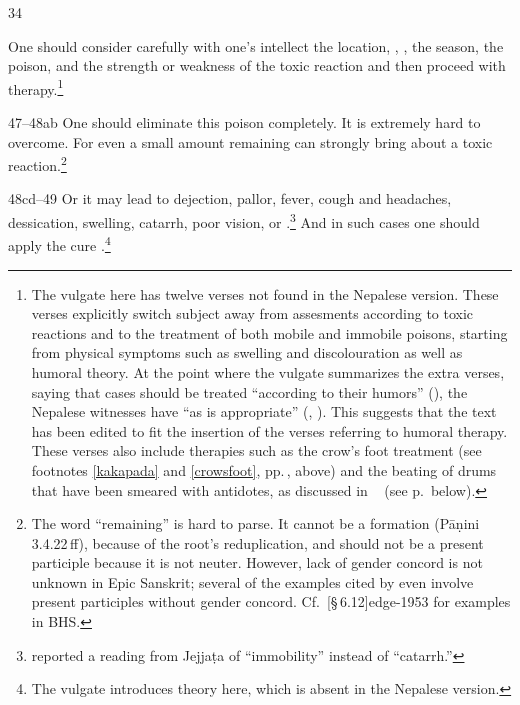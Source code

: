 \begin{translation}
\item[34]

One should consider carefully with one's intellect the location,
, , the season, the
poison, and the strength or weakness of the toxic reaction and then
proceed with therapy.\footnote{The vulgate here has twelve verses not
    found in the Nepalese version.  These verses explicitly switch subject
    away from assesments according to toxic reactions and to the treatment of
    both mobile and immobile poisons, starting from physical symptoms such as
    swelling and discolouration as well as humoral theory. At the point where
    the vulgate summarizes the extra verses, saying that cases should be
    treated “according to their humors” (), the Nepalese
    witnesses have “as is appropriate” (,
    ).  This suggests that the text has been edited to fit
    the insertion of the verses referring to humoral therapy.  These verses also 
    include therapies such as the crow's foot treatment (see footnotes
    \ref{kakapada} and \ref{crowsfoot}, pp.\,\pageref{kakapada}, 
    \pageref{crowsfoot} above) and the beating of drums 
    that have been smeared with antidotes, as discussed in \SS\ 
     (see p.\,\pageref{dundubhi} below).}

\item [47--48ab] One should eliminate this poison completely.  It is
extremely hard to overcome. For even a small amount remaining can
strongly bring about a toxic reaction.\footnote{The word
     “remaining” is hard to parse.  It cannot be a
    \dev{ṇamul} formation (Pāṇini 3.4.22\,ff), because of the root's
    reduplication, and should not be a present participle because it is
    not neuter.  However, lack of gender concord is not unknown in Epic
    Sanskrit; several of the examples cited by
    \citet[\S\,10.2.1]{ober-2003} even involve present participles without
    gender concord. Cf.\ \volcite{1}[\S\,6.12]{edge-1953} for examples in
    BHS.}

\item[48cd--49] Or it may lead to dejection, pallor, fever, cough and
headaches, dessication, swelling, catarrh, poor vision,
 or
.\footnote{ reported
    a reading from Jejjaṭa of \dev{staimitya} “immobility” instead of
    \dev{pratiśyāya} “catarrh.”} And in such cases one should apply the cure
    \diff{as appropriate}.\footnote{The vulgate introduces \dev{doṣa} theory
        here, which is absent in the Nepalese version.}


\end{translation}
